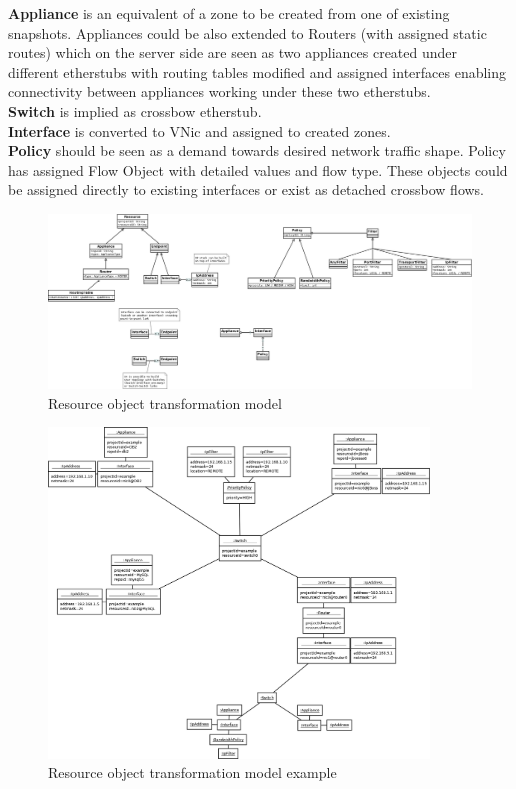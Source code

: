 \documentclass[11pt]{book}
\begin{document}
		\medskip

		\textbf{Appliance} is an equivalent of a zone to be created from one of existing snapshots. Appliances could be
		also extended to Routers (with assigned static routes) which on the server side are seen as two appliances created
		under different etherstubs with routing tables modified and assigned interfaces enabling connectivity between
		appliances working under these two etherstubs. \\
		\textbf{Switch} is implied as crossbow etherstub. \\
		\textbf{Interface} is converted to VNic and assigned to created zones. \\
		\textbf{Policy} should be seen as a demand towards desired network traffic shape. Policy has assigned Flow Object
		with detailed values and flow type. These objects could be assigned directly to existing interfaces or exist as
		detached crossbow flows.

		\begin{figure}[H]
			\begin{center}
				\includegraphics[width=1.2\textwidth, angle=90]{img/impl/resource-object-model.png}
			\end{center}
			\caption{Resource object transformation model}
		\end{figure}

		\begin{figure}[H]
			\begin{center}
				\includegraphics[width=0.9\textwidth]{img/impl/resource-object-model-example.png}
			\end{center}
			\caption{Resource object transformation model example}
		\end{figure}
\end{document}
